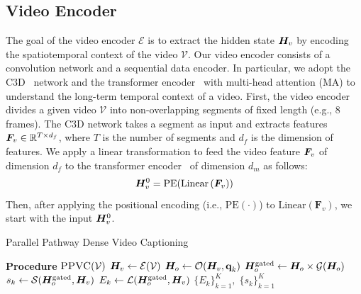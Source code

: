 \subsection{Video Encoder}
The goal of the video encoder $\mathcal{E}$ is to extract the hidden state $\bm{H}_v$ by encoding the spatiotemporal context of the video $\mathcal{V}$.
Our video encoder consists of a convolution network and a sequential data encoder.
In particular, we adopt the C3D~\cite{tran2015learning} network and the transformer encoder~\cite{vaswani2017attention} with multi-head attention (MA) to understand the long-term temporal context of a video.
First, the video encoder divides a given video $\mathcal{V}$ into non-overlapping segments of fixed length (e.g., 8 frames).
The C3D network takes a segment as input and extracts features $\bm{F}_v \in \mathbb{R}^{T \times d_f}$, where $T$ is the number of segments and $d_f$ is the dimension of features.
We apply a linear transformation to feed the video feature $\bm{F}_v$ of dimension $d_f$ to the transformer encoder~\cite{vaswani2017attention} of dimension $d_m$ as follows:
\begin{equation}
  \bm{H}_v^0 = \text{PE} (\text{Linear} \left( \bm{F}_v \right) )
  \label{eq:linear_transformation}
\end{equation}
Then, after applying the positional encoding (i.e., $\text{PE}(\cdot)$) to $\text{Linear}(\bm{F}_v)$, we start with the input $\bm{H}_v^0$.

\begin{algorithm}[t]
  \caption{Parallel Pathway Dense Video Captioning}
  \label{algo:ppvc}
  \begin{algorithmic}[1]
    \STATE \textbf{Procedure} $\textsc{PPVC}(\mathcal{V})$
    \STATE $\bm{H}_v \gets \mathcal{E}(\mathcal{V})$ 
      \STATE $\bm{H}_o \gets \mathcal{O}(\bm{H}_v, \textbf{q}_k)$ 
      \STATE $\bm{H}_o^{\text{gated}} \gets \bm{H}_o \times \mathcal{G}(\bm{H}_o)$ 
      \STATE {}
      \STATE $s_{k} \gets \mathcal{S}(\bm{H}_o^{\text{gated}}, \bm{H}_v)$ 
      \STATE $E_{k} \gets \mathcal{L}(\bm{H}_o^{\text{gated}}, \bm{H}_v)$ 
    \ENDFOR
    \RETURN $\{E_{k}\}_{k=1}^{K},\;\{s_{k}\}_{k=1}^{K}$
  \end{algorithmic}
\end{algorithm}

